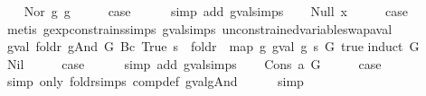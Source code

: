 \begin{isabellebody}
\isamarkupfalse%
\isanewline
\ \ \isamarkupfalse%
\ {\isacharparenleft}Nor\ g{}\ g{}{\isacharparenright}\isanewline
\ \ \isamarkupfalse%
\ \isamarkupfalse%
\ {\isacharquery}case\isanewline
\ \ \ \ \isamarkupfalse%
\ {\isacharparenleft}simp\ add{\isacharcolon}\ gval{\isachardot}simps{\isacharparenleft}{}{\isacharparenright}{\isacharparenright}\isanewline
{}\isamarkupfalse%
\isanewline
\ \ \isamarkupfalse%
\ {\isacharparenleft}Null\ x{\isacharparenright}\isanewline
\ \ \isamarkupfalse%
\ \isamarkupfalse%
\ {\isacharquery}case\isanewline
\ \ \ \ \isamarkupfalse%
\ {\isacharparenleft}metis\ gexp{\isacharunderscore}constrains{\isachardot}simps{\isacharparenleft}{}{\isacharparenright}\ gval{\isachardot}simps{\isacharparenleft}{}{\isacharparenright}\ unconstrained{\isacharunderscore}variable{\isacharunderscore}swap{\isacharunderscore}aval{\isacharparenright}\isanewline
{}\isamarkupfalse%
%
\endisatagproof
{\isafoldproof}%
%
\isadelimproof
\isanewline
%
\endisadelimproof
\isanewline
{}\isamarkupfalse%
\ {\isachardoublequoteopen}gval\ {\isacharparenleft}foldr\ gAnd\ G\ {\isacharparenleft}Bc\ True{\isacharparenright}{\isacharparenright}\ s\ {\isacharequal}\ foldr\ {\isacharparenleft}{\isasymand}\isactrlsub {\isacharquery}{\isacharparenright}\ {\isacharparenleft}map\ {\isacharparenleft}{\isasymlambda}g{\isachardot}\ gval\ g\ s{\isacharparenright}\ G{\isacharparenright}\ true{\isachardoublequoteclose}\isanewline
%
\isadelimproof
%
\endisadelimproof
%
\isatagproof
{}\isamarkupfalse%
{\isacharparenleft}induct\ G{\isacharparenright}\isanewline
\ \ \isamarkupfalse%
\ Nil\isanewline
\ \ \isamarkupfalse%
\ \isamarkupfalse%
\ {\isacharquery}case\isanewline
\ \ \ \ \isamarkupfalse%
\ {\isacharparenleft}simp\ add{\isacharcolon}\ gval{\isachardot}simps{\isacharparenright}\isanewline
{}\isamarkupfalse%
\isanewline
\ \ \isamarkupfalse%
\ {\isacharparenleft}Cons\ a\ G{\isacharparenright}\isanewline
\ \ \isamarkupfalse%
\ \isamarkupfalse%
\ {\isacharquery}case\isanewline
\ \ \ \ \isamarkupfalse%
\ {\isacharparenleft}simp\ only{\isacharcolon}\ foldr{\isachardot}simps\ comp{\isacharunderscore}def\ gval{\isacharunderscore}gAnd{\isacharparenright}\isanewline
\ \ \ \ \isamarkupfalse%
\ simp\isanewline
{}\isamarkupfalse%
%
\endisatagproof
{\isafoldproof}%
%
\isadelimproof
\isanewline
%
\endisadelimproof
%
\isadelimtheory
\isanewline
%
\endisadelimtheory
%
\isatagtheory
{}\isamarkupfalse%
%
\endisatagtheory
{\isafoldtheory}%
%
\isadelimtheory
%
\endisadelimtheory
%
\end{isabellebody}%
